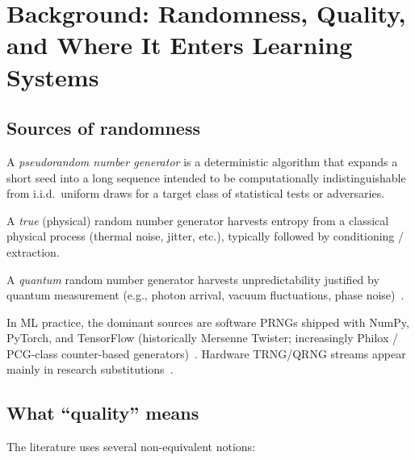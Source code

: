 \section{Background: Randomness, Quality, and Where It Enters Learning Systems}
\label{sec:background}

\subsection{Sources of randomness}

\begin{definition}[PRNG]
A \emph{pseudorandom number generator} is a deterministic algorithm that expands a short seed into a long sequence intended to be computationally indistinguishable from i.i.d.\ uniform draws for a target class of statistical tests or adversaries.
\end{definition}

\begin{definition}
A \emph{true} (physical) random number generator harvests entropy from a classical physical process (thermal noise, jitter, etc.), typically followed by conditioning / extraction.
\end{definition}

\begin{definition}[QRNG]
A \emph{quantum} random number generator harvests unpredictability justified by quantum measurement (e.g., photon arrival, vacuum fluctuations, phase noise)~\cite{herrero2017quantum,mannalath2022qrng}.
\end{definition}

In ML practice, the dominant sources are software PRNGs shipped with NumPy, PyTorch, and TensorFlow (historically Mersenne Twister; increasingly Philox / PCG-class counter-based generators)~\cite{antunes2025statistical,antunes2024reproducibility}.
Hardware TRNG/QRNG streams appear mainly in research substitutions~\cite{bird2019softcomputing,koivu2022dropout,heese2024biased}.

\subsection{What ``quality'' means}

The literature uses several non-equivalent notions:

